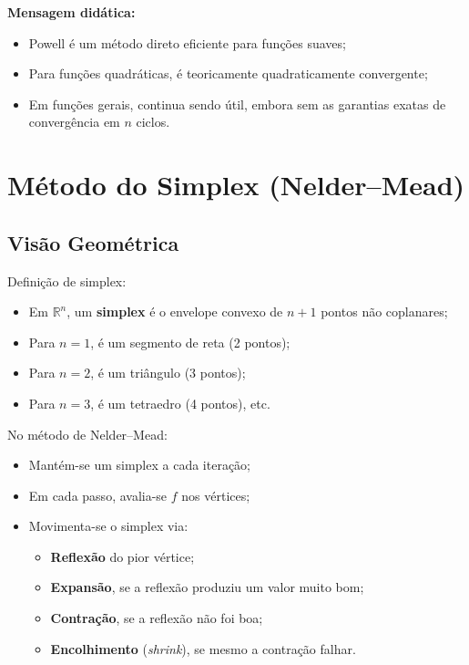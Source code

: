 \documentclass[9pt,a4paper]{extarticle}
\begin{document}
\textbf{Mensagem didática:}
\begin{itemize}
    \item Powell é um método direto eficiente para funções suaves;
    \item Para funções quadráticas, é teoricamente quadraticamente convergente;
    \item Em funções gerais, continua sendo útil, embora sem as garantias exatas de convergência em $n$ ciclos.
\end{itemize}

\section{Método do Simplex (Nelder--Mead)}

\subsection{Visão Geométrica}

Definição de simplex:
\begin{itemize}
    \item Em $\mathbb{R}^n$, um \textbf{simplex} é o envelope convexo de $n+1$ pontos não coplanares;
    \item Para $n=1$, é um segmento de reta (2 pontos);
    \item Para $n=2$, é um triângulo (3 pontos);
    \item Para $n=3$, é um tetraedro (4 pontos), etc.
\end{itemize}

No método de Nelder--Mead:
\begin{itemize}
    \item Mantém-se um simplex a cada iteração;
    \item Em cada passo, avalia-se $f$ nos vértices;
    \item Movimenta-se o simplex via:
    \begin{itemize}
        \item \textbf{Reflexão} do pior vértice;
        \item \textbf{Expansão}, se a reflexão produziu um valor muito bom;
        \item \textbf{Contração}, se a reflexão não foi boa;
        \item \textbf{Encolhimento} (\emph{shrink}), se mesmo a contração falhar.
    \end{itemize}
\end{itemize}
\end{document}
